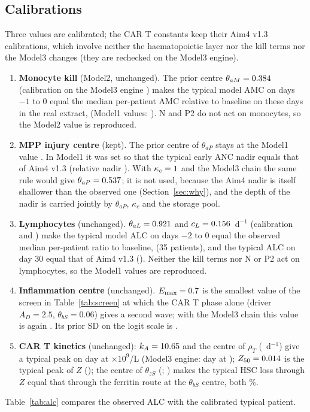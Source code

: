 \documentclass[11pt]{article}
\begin{document}
\subsection{Calibrations}
Three values are calibrated; the CAR T constants keep their Aim4 v1.3 calibrations, which involve neither the haematopoietic layer nor the kill terms nor the Model3 changes (they are rechecked on the Model3 engine).
\begin{enumerate}
\item \textbf{Monocyte kill} (Model2, unchanged). The prior centre $\theta_{aM}=0.384$ (calibration on the Model3 engine \valThAmCal) makes the typical model AMC on days $-1$ to 0 equal the median per-patient AMC relative to baseline on these days in the real extract, \valAmcTarget{} (Model1 values: \valAmcLdModelOne). N and P2 do not act on monocytes, so the Model2 value is reproduced.
\item \textbf{MPP injury centre} (kept). The prior centre of $\theta_{aP}$ stays at the Model1 value \valThapCentre. In Model1 it was set so that the typical early ANC nadir equals that of Aim4 v1.3 (relative nadir \valAncNadirAimFour). With $\kappa_c=1$ and the Model3 chain the same rule would give $\theta_{aP}=0.537$; it is not used, because the Aim4 nadir is itself shallower than the observed one (Section~\ref{sec:why}), and the depth of the nadir is carried jointly by $\theta_{aP}$, $\kappa_c$ and the storage pool.
\item \textbf{Lymphocytes} (unchanged). $\theta_{aL}=0.921$ and $c_L=0.156$~d$^{-1}$ (calibration \valThalCal{} and \valClCal) make the typical model ALC on days $-2$ to 0 equal the observed median per-patient ratio to baseline, \valAlcTarget{} (35 patients), and the typical ALC on day 30 equal that of Aim4 v1.3 (\valAlcDayThirty). Neither the kill terms nor N or P2 act on lymphocytes, so the Model1 values are reproduced.
\item \textbf{Inflammation centre} (unchanged). $E_{\max}=0.7$ is the smallest value of the screen in Table~\ref{tab:screen} at which the CAR T phase alone (driver $A_D=2.5$, $\theta_{bS}=0.06$) gives a second wave; with the Model3 chain this value is again \valEmaxScreenSW. Its prior SD on the logit scale is \valEmaxSd.
\item \textbf{CAR T kinetics} (unchanged): $k_A=10.65$ and the centre of $\rho_T$ (\valRhoCentre~d$^{-1}$) give a typical peak on day \valCartPeakDay{} at \valCartPeak{} $\times10^9$/L (Model3 engine: day \valCartPeakDayModel{} at \valCartPeakModel); $Z_{50}=0.014$ is the typical peak of $Z$ (\valZfiftyModel); the centre of $\theta_{zS}$ (\valThzs; \valThzsModel) makes the typical HSC loss through $Z$ equal that through the ferritin route at the $\theta_{bS}$ centre, both \valRouteLoss\%.
\end{enumerate}
Table~\ref{tab:alc} compares the observed ALC with the calibrated typical patient.
\end{document}
